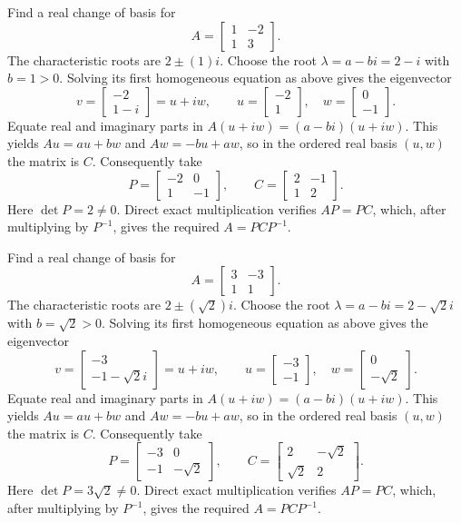 \goal Find a real change of basis for
\[A=\begin{bmatrix}1&-2\\1&3\end{bmatrix}.\]
The characteristic roots are $2\pm(1)i$. Choose the root $\lambda=a-bi=2 - i$ with $b=1>0$. Solving its first homogeneous equation as above gives the eigenvector
\[v=\begin{bmatrix}-2\\1 - i\end{bmatrix}=u+iw,\qquad u=\begin{bmatrix}-2\\1\end{bmatrix},\quad w=\begin{bmatrix}0\\-1\end{bmatrix}.\]
Equate real and imaginary parts in $A(u+iw)=(a-bi)(u+iw)$. This yields $Au=au+bw$ and $Aw=-bu+aw$, so in the ordered real basis $(u,w)$ the matrix is $C$. Consequently take
\[P=\begin{bmatrix}-2&0\\1&-1\end{bmatrix},\qquad C=\begin{bmatrix}2&-1\\1&2\end{bmatrix}.\]
Here $\det P=2\ne0$. Direct exact multiplication verifies $AP=PC$, which, after multiplying by $P^{-1}$, gives the required $A=PCP^{-1}$.


\goal Find a real change of basis for
\[A=\begin{bmatrix}3&-3\\1&1\end{bmatrix}.\]
The characteristic roots are $2\pm(\sqrt{2})i$. Choose the root $\lambda=a-bi=2 - \sqrt{2} i$ with $b=\sqrt{2}>0$. Solving its first homogeneous equation as above gives the eigenvector
\[v=\begin{bmatrix}-3\\-1 - \sqrt{2} i\end{bmatrix}=u+iw,\qquad u=\begin{bmatrix}-3\\-1\end{bmatrix},\quad w=\begin{bmatrix}0\\- \sqrt{2}\end{bmatrix}.\]
Equate real and imaginary parts in $A(u+iw)=(a-bi)(u+iw)$. This yields $Au=au+bw$ and $Aw=-bu+aw$, so in the ordered real basis $(u,w)$ the matrix is $C$. Consequently take
\[P=\begin{bmatrix}-3&0\\-1&- \sqrt{2}\end{bmatrix},\qquad C=\begin{bmatrix}2&- \sqrt{2}\\\sqrt{2}&2\end{bmatrix}.\]
Here $\det P=3 \sqrt{2}\ne0$. Direct exact multiplication verifies $AP=PC$, which, after multiplying by $P^{-1}$, gives the required $A=PCP^{-1}$.


